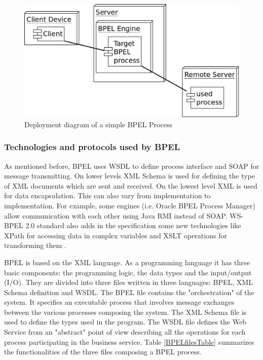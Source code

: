 \begin{figure}
\begin{center}
\includegraphics[width=125mm]{pictures/deployment.jpeg}
\caption{ Deployment diagram of a simple BPEL Process}
\label{BPELprocess}
\end{center}
\end{figure}

\subsubsection{Technologies and protocols used by BPEL}
As mentioned before, BPEL uses WSDL to define process interface and SOAP for message transmitting. On lower levels XML Schema is used for defining the type of XML documents which are sent and received. On the lowest level XML is used for data encapsulation. This can also vary from implementation to implementation. For example, some engines (i.e. Oracle BPEL Process Manager) allow communication with each other using Java RMI instead of SOAP. WS-BPEL 2.0 standard also adds in the specification some new technologies like XPath for accessing data in complex variables and XSLT operations for transforming them \cite{OraBPELRMIInvocation}.


\label{BPELfiles}
BPEL is based on the XML language. As a programming language it has three basic components: the programming logic, the data types and the input/output (I/O). They are divided into three files written in three languages: BPEL, XML Schema definition and WSDL. 
The BPEL file contains the "orchestration" of the system. It specifies an executable process that involves message exchanges between the various processes composing the system. The XML Schema file is used to define the types used in the program. The WSDL file defines the Web Service from an "abstract" point of view describing all the operations for each process participating in the business service.
Table \ref{BPELfilesTable} summarizes the functionalities of the three files composing a BPEL process.

